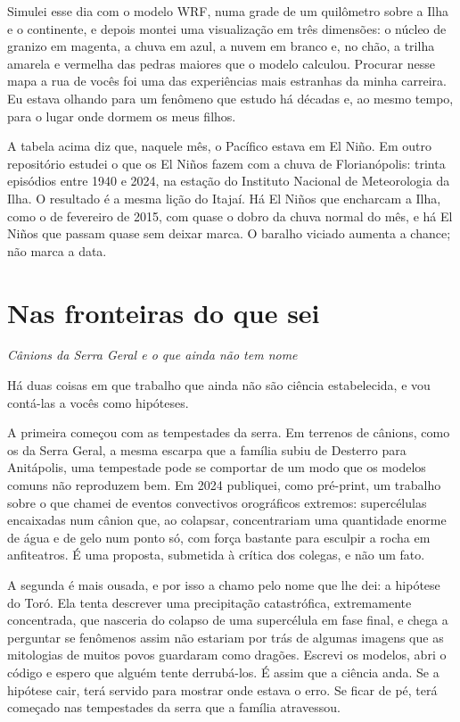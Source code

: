 \documentclass[
  brazilian,
  11pt,
  openany]{book}
\begin{document}
Simulei esse dia com o modelo WRF, numa grade de um quilômetro sobre a
Ilha e o continente, e depois montei uma visualização em três dimensões:
o núcleo de granizo em magenta, a chuva em azul, a nuvem em branco e, no
chão, a trilha amarela e vermelha das pedras maiores que o modelo
calculou. Procurar nesse mapa a rua de vocês foi uma das experiências
mais estranhas da minha carreira. Eu estava olhando para um fenômeno que
estudo há décadas e, ao mesmo tempo, para o lugar onde dormem os meus
filhos.

A tabela acima diz que, naquele mês, o Pacífico estava em El Niño. Em
outro repositório estudei o que os El Niños fazem com a chuva de
Florianópolis: trinta episódios entre 1940 e 2024, na estação do
Instituto Nacional de Meteorologia da Ilha. O resultado é a mesma lição
do Itajaí. Há El Niños que encharcam a Ilha, como o de fevereiro de
2015, com quase o dobro da chuva normal do mês, e há El Niños que passam
quase sem deixar marca. O baralho viciado aumenta a chance; não marca a
data.

\section{Nas fronteiras do que sei}\label{nas-fronteiras-do-que-sei}

\emph{Cânions da Serra Geral e o que ainda não tem nome}

Há duas coisas em que trabalho que ainda não são ciência estabelecida, e
vou contá-las a vocês como hipóteses.

A primeira começou com as tempestades da serra. Em terrenos de cânions,
como os da Serra Geral, a mesma escarpa que a família subiu de Desterro
para Anitápolis, uma tempestade pode se comportar de um modo que os
modelos comuns não reproduzem bem. Em 2024 publiquei, como pré-print, um
trabalho sobre o que chamei de eventos convectivos orográficos extremos:
supercélulas encaixadas num cânion que, ao colapsar, concentrariam uma
quantidade enorme de água e de gelo num ponto só, com força bastante
para esculpir a rocha em anfiteatros. É uma proposta, submetida à
crítica dos colegas, e não um fato.

A segunda é mais ousada, e por isso a chamo pelo nome que lhe dei: a
hipótese do Toró. Ela tenta descrever uma precipitação catastrófica,
extremamente concentrada, que nasceria do colapso de uma supercélula em
fase final, e chega a perguntar se fenômenos assim não estariam por trás
de algumas imagens que as mitologias de muitos povos guardaram como
dragões. Escrevi os modelos, abri o código e espero que alguém tente
derrubá-los. É assim que a ciência anda. Se a hipótese cair, terá
servido para mostrar onde estava o erro. Se ficar de pé, terá começado
nas tempestades da serra que a família atravessou.
\end{document}
